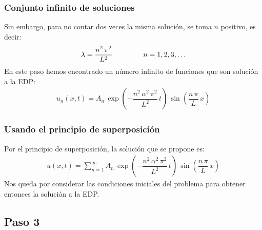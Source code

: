 \documentclass[12pt]{beamer}
\begin{document}
\begin{frame}
\frametitle{Conjunto infinito de soluciones}
Sin embargo, para no contar dos veces la misma solución, se toma $n$ positivo, es decir:
\begin{align}
\lambda = \dfrac{n^{2} \, \pi^{2}}{L^{2}} \hspace{1.5cm} n = 1, 2, 3, \ldots
\label{eq:ecuacion_06_02_35}
\end{align}
\pause
En este paso hemos encontrado un número infinito de funciones que son solución a la EDP:
\begin{align}
u_{n} (x, t) = A_{n} \, \exp \left( - \dfrac{n^{2} \, \alpha^{2} \, \pi^{2}}{L^{2}} \, t \right) \, \sin \left( \dfrac{n \, \pi}{L} \, x \right)
\label{eq:ecuacion_06_02_37}    
\end{align}
\end{frame}
\begin{frame}
\frametitle{Usando el principio de superposición}
Por el principio de superposición, la solución que se propone es:
\pause
\begin{align}
u (x, t) = \sum_{n=1}^{\infty} A_{n} \, \exp \left( - \dfrac{n^{2} \, \alpha^{2} \, \pi^{2}}{L^{2}} \, t \right) \, \sin \left( \dfrac{n \, \pi}{L} \, x \right)
\label{eq:ecuacion_06_02_38}
\end{align}
\pause
Nos queda por considerar las condiciones iniciales del problema para obtener entonces la solución a la EDP.
\end{frame}

\subsection{Paso 3}
\end{document}
